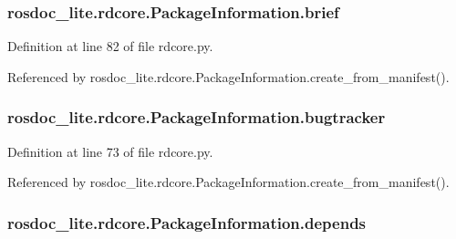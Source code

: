 \subsubsection[{\texorpdfstring{brief}{brief}}]{\setlength{\rightskip}{0pt plus 5cm}rosdoc\+\_\+lite.\+rdcore.\+Package\+Information.\+brief}\hypertarget{classrosdoc__lite_1_1rdcore_1_1PackageInformation_aea176e3d7ce96d59c465aa7ea95cba0f}{}\label{classrosdoc__lite_1_1rdcore_1_1PackageInformation_aea176e3d7ce96d59c465aa7ea95cba0f}


Definition at line 82 of file rdcore.\+py.



Referenced by rosdoc\+\_\+lite.\+rdcore.\+Package\+Information.\+create\+\_\+from\+\_\+manifest().

\subsubsection[{\texorpdfstring{bugtracker}{bugtracker}}]{\setlength{\rightskip}{0pt plus 5cm}rosdoc\+\_\+lite.\+rdcore.\+Package\+Information.\+bugtracker}\hypertarget{classrosdoc__lite_1_1rdcore_1_1PackageInformation_a587611359b64f8680f3dc88110406e38}{}\label{classrosdoc__lite_1_1rdcore_1_1PackageInformation_a587611359b64f8680f3dc88110406e38}


Definition at line 73 of file rdcore.\+py.



Referenced by rosdoc\+\_\+lite.\+rdcore.\+Package\+Information.\+create\+\_\+from\+\_\+manifest().

\subsubsection[{\texorpdfstring{depends}{depends}}]{\setlength{\rightskip}{0pt plus 5cm}rosdoc\+\_\+lite.\+rdcore.\+Package\+Information.\+depends}\hypertarget{classrosdoc__lite_1_1rdcore_1_1PackageInformation_a6ba9c49b465bee65c40b4561b7f58ee5}{}\label{classrosdoc__lite_1_1rdcore_1_1PackageInformation_a6ba9c49b465bee65c40b4561b7f58ee5}


